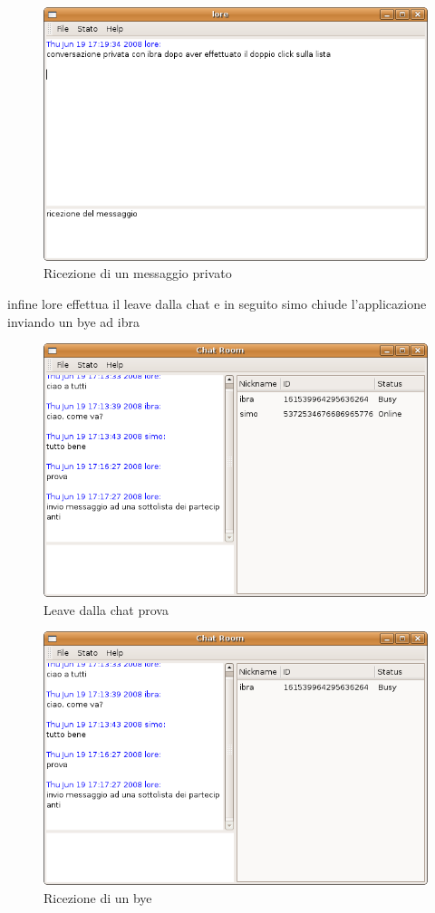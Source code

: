 \begin{figure}[H]
\begin{center}
\includegraphics[scale=0.5]{etc/ricezione_pm.png}
\caption{Ricezione di un messaggio privato}
\label{ricezionepm}
\end{center}
\end{figure}
infine lore effettua il leave dalla chat e in seguito simo chiude l'applicazione inviando un bye ad ibra
\begin{figure}[H]
\begin{center}
\includegraphics[scale=0.5]{etc/leave_lore.png}
\caption{Leave dalla chat prova}
\label{leavelore}
\end{center}
\end{figure}
\begin{figure}[H]
\begin{center}
\includegraphics[scale=0.5]{etc/bye_simo.png}
\caption{Ricezione di un bye}
\label{byesimo}
\end{center}
\end{figure}

